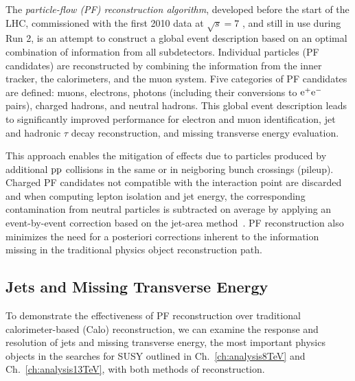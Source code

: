 The \emph{particle-flow (PF) reconstruction algorithm}, developed before the start of the
LHC, commissioned with the first 2010 data at
$\sqrt{s}=7$ \TeV, and still in use during Run 2, is an attempt to
construct a global event description based on an optimal combination
of information from all subdetectors. Individual particles (PF candidates) are reconstructed by combining the information from the inner
tracker, the calorimeters, and the muon system. Five categories of PF
candidates are defined: muons, electrons, photons (including their
conversions to $\mathrm{e}^+\mathrm{e}^-$ pairs), charged hadrons, and neutral
hadrons. This global event description leads to significantly improved performance for electron and muon identification, jet and
hadronic $\tau$ decay reconstruction, and missing transverse energy
evaluation. 

This approach enables the mitigation of effects due to
particles produced by additional $\mathrm{p}\mathrm{p}$ collisions in the same or in neigboring bunch
crossings (pileup). Charged PF candidates not compatible
with the interaction point are discarded and when computing lepton
isolation and jet energy, the corresponding contamination from neutral
particles is subtracted on average by applying an event-by-event correction based on the jet-area
method~\cite{jetarea_fastjet,jetarea_fastjet_pu,JME-JINST}. PF reconstruction also minimizes the need
for a posteriori corrections inherent to the information missing in
the traditional physics object reconstruction path. 

\subsection{Jets and Missing Transverse Energy}

To demonstrate the effectiveness of PF reconstruction over traditional
calorimeter-based (Calo) reconstruction, we can examine the response
and resolution of jets and missing transverse energy, the most
important physics objects in the searches for SUSY outlined in
Ch.~\ref{ch:analysis8TeV} and Ch.~\ref{ch:analysis13TeV}, with both
methods of reconstruction.

